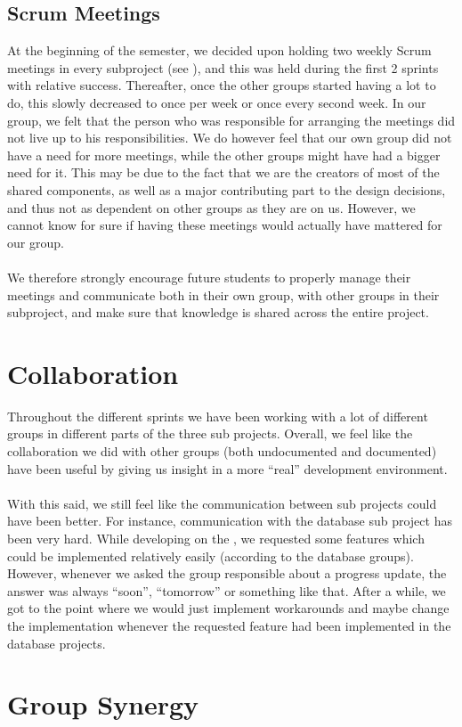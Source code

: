 \subsection{Scrum Meetings}
At the beginning of the semester, we decided upon holding two weekly Scrum meetings in every subproject (see ), and this was held during the first 2 sprints with relative success. Thereafter, once the other groups started having a lot to do, this slowly decreased to once per week or once every second week. In our group, we felt that the person who was responsible for arranging the meetings did not live up to his responsibilities. We do however feel that our own group did not have a need for more meetings, while the other groups might have had a bigger need for it. This may be due to the fact that we are the creators of most of the shared components, as well as a major contributing part to the design decisions, and thus not as dependent on other groups as they are on us. However, we cannot know for sure if having these meetings would actually have mattered for our group.
\\\\ 
We therefore strongly encourage future students to properly manage their meetings and communicate both in their own group, with other groups in their subproject, and make sure that knowledge is shared across the entire project.

\section{Collaboration}
Throughout the different sprints we have been working with a lot of different groups in different parts of the three sub projects. Overall, we feel like the collaboration we did with other groups (both undocumented and documented) have been useful by giving us insight in a more ``real'' development environment.
\\\\
With this said, we still feel like the communication between sub projects could have been better. For instance, communication with the database sub project has been very hard. While developing on the \ct, we requested some features which could be implemented relatively easily (according to the database groups). However, whenever we asked the group responsible about a progress update, the answer was always ``soon'', ``tomorrow'' or something like that. After a while, we got to the point where we would just implement workarounds and maybe change the implementation whenever the requested feature had been implemented in the database projects. 

\section{Group Synergy}
